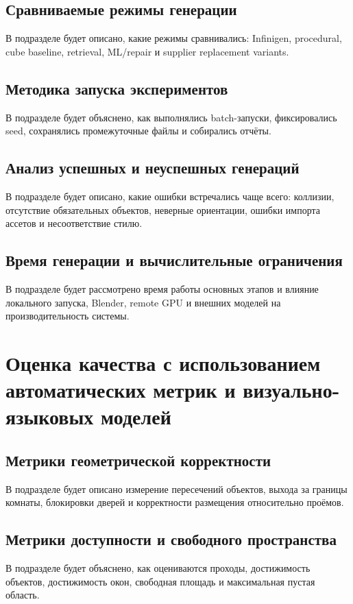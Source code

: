 \documentclass[times]{itmo-student-thesis}
\begin{document}
\subsection{Сравниваемые режимы генерации}
В подразделе будет описано, какие режимы сравнивались: Infinigen, procedural, cube baseline, retrieval, ML/repair и supplier replacement variants.

\subsection{Методика запуска экспериментов}
В подразделе будет объяснено, как выполнялись batch-запуски, фиксировались seed, сохранялись промежуточные файлы и собирались отчёты.

\subsection{Анализ успешных и неуспешных генераций}
В подразделе будет описано, какие ошибки встречались чаще всего: коллизии, отсутствие обязательных объектов, неверные ориентации, ошибки импорта ассетов и несоответствие стилю.

\subsection{Время генерации и вычислительные ограничения}
В подразделе будет рассмотрено время работы основных этапов и влияние локального запуска, Blender, remote GPU и внешних моделей на производительность системы.

\section{Оценка качества с использованием автоматических метрик и визуально-языковых моделей}

\subsection{Метрики геометрической корректности}
В подразделе будет описано измерение пересечений объектов, выхода за границы комнаты, блокировки дверей и корректности размещения относительно проёмов.

\subsection{Метрики доступности и свободного пространства}
В подразделе будет объяснено, как оцениваются проходы, достижимость объектов, достижимость окон, свободная площадь и максимальная пустая область.
\end{document}
